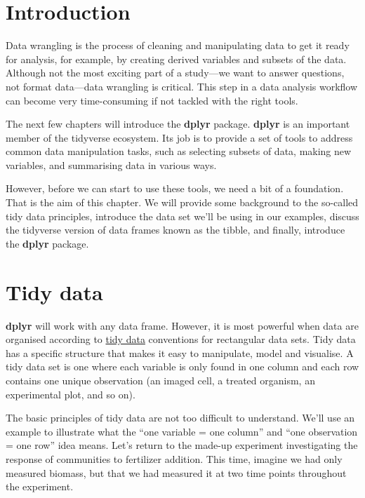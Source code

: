 \documentclass[
]{book}
\begin{document}
\hypertarget{introduction-2}{%
\section{Introduction}\label{introduction-2}}

Data wrangling is the process of cleaning and manipulating data to get it ready for analysis, for example, by creating derived variables and subsets of the data. Although not the most exciting part of a study---we want to answer questions, not format data---data wrangling is critical. This step in a data analysis workflow can become very time-consuming if not tackled with the right tools.

The next few chapters will introduce the \textbf{dplyr} package. \textbf{dplyr} is an important member of the tidyverse ecosystem. Its job is to provide a set of tools to address common data manipulation tasks, such as selecting subsets of data, making new variables, and summarising data in various ways.

However, before we can start to use these tools, we need a bit of a foundation. That is the aim of this chapter. We will provide some background to the so-called tidy data principles, introduce the data set we'll be using in our examples, discuss the tidyverse version of data frames known as the tibble, and finally, introduce the \textbf{dplyr} package.

\hypertarget{tidy-data}{%
\section{Tidy data}\label{tidy-data}}

\textbf{dplyr} will work with any data frame. However, it is most powerful when data are organised according to \href{http://vita.had.co.nz/papers/tidy-data.pdf}{tidy data} conventions for rectangular data sets. Tidy data has a specific structure that makes it easy to manipulate, model and visualise. A tidy data set is one where each variable is only found in one column and each row contains one unique observation (an imaged cell, a treated organism, an experimental plot, and so on).

The basic principles of tidy data are not too difficult to understand. We'll use an example to illustrate what the ``one variable = one column'' and ``one observation = one row'' idea means. Let's return to the made-up experiment investigating the response of communities to fertilizer addition. This time, imagine we had only measured biomass, but that we had measured it at two time points throughout the experiment.
\end{document}
